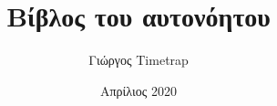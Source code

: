 \documentclass[a4paper,10pt]{book}
\author{Γιώργος \latintext Timetrap}
\date{Απρίλιος 2020}
\title{Βίβλος του αυτονόητου}
\begin{document}
\begin{titlepage}
\maketitle
\end{titlepage}



\end{document}
